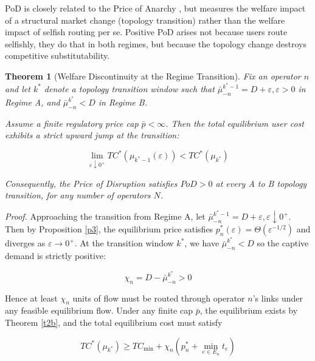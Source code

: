 \documentclass[review,3p,authoryear]{elsarticle}
\newtheorem{theorem}{Theorem}[section]
\begin{document}
PoD is closely related to the Price of Anarchy \cite{roughgarden2002bad}, but measures the welfare impact of a structural market change (topology transition) rather than the welfare impact of selfish routing per se. Positive PoD arises not because users route selfishly, they do that in both regimes, but because the topology change destroys competitive substitutability.

\begin{theorem}[Welfare Discontinuity at the Regime Transition]\label{t3}
Fix an operator $n$ and let $k^{*}$ denote a topology transition window such that $\bar{{\mu}}_{-n}^{k^{*}-1}=D+{\varepsilon},{\varepsilon}>0$ in Regime A, and $\bar{{\mu}}_{-n}^{k^{*}}<D$ in Regime B.

Assume a finite regulatory price cap $\bar{p}<{\infty}$. Then the total equilibrium user cost exhibits a strict upward jump at the transition:

\begin{equation}
\lim_{{\varepsilon}{\downarrow}0^{+}}TC^{*} \left({\mu}_{k^{*}-1}({\varepsilon})\right)<TC^{*}({\mu}_{k^{*}})
\end{equation}

Consequently, the Price of Disruption satisfies $PoD>0$ at every A to B topology transition, for any number of operators $N$.
\end{theorem}

\medskip\noindent\textit{Proof.} Approaching the transition from Regime A, let $\bar{{\mu}}_{-n}^{k^{*}-1}=D+{\varepsilon},{\varepsilon}{\downarrow}0^{+}$. Then by Proposition \ref{p3}, the equilibrium price satisfies $p_{n}^{*}({\varepsilon})={\Theta} \left({\varepsilon}^{-1/2}\right)$ and diverges as ${\varepsilon}{\to}0^{+}$. At the transition window $k^{*}$, we have $\bar{{\mu}}_{-n}^{k^{*}}<D$ so the captive demand is strictly positive:

\begin{equation}
{\chi}_{n}=D-\bar{{\mu}}_{-n}^{ k^{*}}>0
\end{equation}

Hence at least ${\chi}_{n}$ units of flow must be routed through operator $n$'s links under any feasible equilibrium flow. Under any finite cap $\bar{p}$, the equilibrium exists by Theorem \ref{t2b}, and the total equilibrium cost must satisfy

\begin{equation}
TC^{*}({\mu}_{k^{*}}){\ge}TC_{\min}+{\chi}_{n}(p_{n}^{*}+\min_{e{\in}E_{n}}t_{e})
\end{equation}
\end{document}
